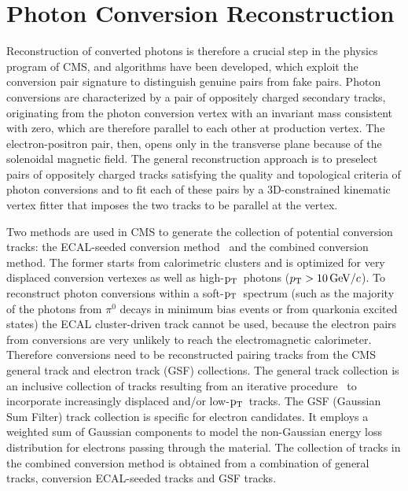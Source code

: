\documentclass[a4paper]{jpconf}
\def \pt{$\p_{\rm T}$~}
\begin{document}

\section{Photon Conversion Reconstruction}
\label{standard}


Reconstruction of converted photons is therefore a crucial step in the physics program of CMS, and  algorithms have been developed, which exploit the conversion pair signature to distinguish genuine pairs from fake pairs.
%
Photon conversions are characterized by a pair of
oppositely charged secondary tracks, originating from the photon conversion vertex with an
invariant mass consistent with zero,  which are therefore parallel
to each other at production vertex. The electron-positron pair, then,
opens only in the transverse plane because of the solenoidal magnetic field.
The general reconstruction approach is to preselect pairs of oppositely charged tracks satisfying the quality and topological criteria of photon conversions and to fit each of these pairs by a 3D-constrained kinematic vertex 
fitter that imposes the two tracks to be parallel at the vertex. 

Two methods are used in CMS to generate the collection of potential conversion tracks: the ECAL-seeded conversion method~\cite{EGM-10-005}  and the combined conversion method. The former starts from calorimetric clusters and is optimized for very displaced conversion vertexes as well as high-\pt photons ($p_{\rm T} >10{\rm \, GeV}/c$).
To reconstruct photon conversions within a soft-\pt spectrum (such as the majority of the photons from $\pi^0$ decays in minimum bias events or from quarkonia excited states) the ECAL cluster-driven track cannot be used,  because the electron pairs from conversions are very unlikely to reach the electromagnetic calorimeter.
Therefore  conversions need to be reconstructed pairing tracks from the  CMS general track and electron track (GSF) collections.
The general track collection is 
 an inclusive collection of   tracks resulting from an iterative procedure~\cite{TRK-10-001} to incorporate increasingly displaced and/or low-\pt tracks.
%
 The GSF (Gaussian Sum Filter) track collection is specific for electron candidates. It employs a 
  weighted  	sum of Gaussian components to model the non-Gaussian energy loss distribution for electrons passing through the material. 
%
The collection of tracks in the combined conversion method is obtained from a combination of general tracks,  conversion ECAL-seeded tracks and GSF tracks.
\end{document}
